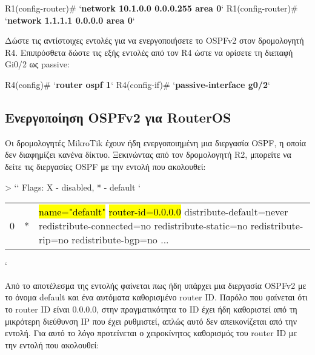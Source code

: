 \documentclass{EdipyLabs} %
\begin{document}
\begin{CommandBox}
R1(config-router)# `\textbf{network 10.1.0.0 0.0.0.255 area 0}`
R1(config-router)# `\textbf{network 1.1.1.1 0.0.0.0 area 0}`
\end{CommandBox} 

Δώστε τις αντίστοιχες εντολές για να ενεργοποιήσετε το OSPFv2 στον δρομολογητή R4. Επιπρόσθετα δώστε τις εξής εντολές από τον R4 ώστε να ορίσετε τη διεπαφή Gi0/2 ως passive:

\begin{CommandBox}
R4(config)# `\textbf{router ospf 1}`
R4(config-if)# `\textbf{passive-interface g0/2}`
\end{CommandBox} 


\subsection{Ενεργοποίηση OSPFv2 για RouterOS}

Οι δρομολογητές MikroTik έχουν ήδη ενεργοποιημένη μια διεργασία OSPF, η οποία δεν διαφημίζει κανένα δίκτυο. Ξεκινώντας από τον δρομολογητή R2, μπορείτε να δείτε τις διεργασίες OSPF με την εντολή που ακολουθεί:   

\begin{CommandBox}
[admin@R2] > ``
Flags: X - disabled, * - default
`\begin{tabular}{llp{15cm}}
	0     &*   &\hl{name="default"} \hl{router-id=0.0.0.0} distribute-default=never redistribute-connected=no
	redistribute-static=no redistribute-rip=no redistribute-bgp=no ...
\end{tabular}`     
\end{CommandBox} 

Από το αποτέλεσμα της εντολής φαίνεται πως ήδη υπάρχει μια διεργασία OSPFv2 με το όνομα default και ένα αυτόματα καθορισμένο router ID. Παρόλο που φαίνεται ότι το router ID είναι 0.0.0.0, στην πραγματικότητα το ID έχει ήδη καθοριστεί από τη μικρότερη διεύθυνση IP που έχει ρυθμιστεί, απλώς αυτό δεν απεικονίζεται από την εντολή. Για αυτό το λόγο προτείνεται ο χειροκίνητος καθορισμός του router ID με την εντολή που ακολουθεί:
\end{document}
